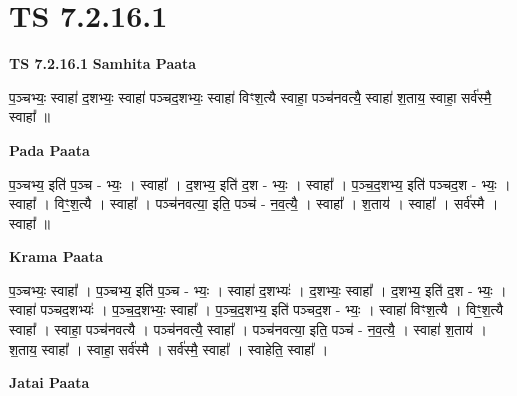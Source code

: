 \documentclass[17pt]{extarticle}
\begin{document}
\section{ TS 7.2.16.1 }

\textbf{TS 7.2.16.1 } \newline
\textbf{Samhita Paata} \newline

प॒ञ्चभ्यः॒ स्वाहा॑ द॒शभ्यः॒ स्वाहा॑ पञ्चद॒शभ्यः॒ स्वाहा॑ विꣳश॒त्यै स्वाहा॒ पञ्च॑नवत्यै॒ स्वाहा॑ श॒ताय॒ स्वाहा॒ सर्व॑स्मै॒ स्वाहा᳚ ॥ \newline

\textbf{Pada Paata} \newline

प॒ञ्चभ्य॒ इति॑ प॒ञ्च - भ्यः॒ । स्वाहा᳚ । द॒शभ्य॒ इति॑ द॒श - भ्यः॒ । स्वाहा᳚ । प॒ञ्च॒द॒शभ्य॒ इति॑ पञ्चद॒श - भ्यः॒ । स्वाहा᳚ । विꣳ॒॒श॒त्यै । स्वाहा᳚ । पञ्च॑नवत्या॒ इति॒ पञ्च॑ - न॒व॒त्यै॒ । स्वाहा᳚ । श॒ताय॑ । स्वाहा᳚ । सर्व॑स्मै । स्वाहा᳚ ॥  \newline


\textbf{Krama Paata} \newline

प॒ञ्चभ्यः॒ स्वाहा᳚ । प॒ञ्चभ्य॒ इति॑ प॒ञ्च - भ्यः॒ । स्वाहा॑ द॒शभ्यः॑ । द॒शभ्यः॒ स्वाहा᳚ । द॒शभ्य॒ इति॑ द॒श - भ्यः॒ । स्वाहा॑ पञ्चद॒शभ्यः॑ । प॒ञ्च॒द॒शभ्यः॒ स्वाहा᳚ । प॒ञ्च॒द॒शभ्य॒ इति॑ पञ्चद॒श - भ्यः॒ । स्वाहा॑ विꣳश॒त्यै । विꣳ॒॒श॒त्यै स्वाहा᳚ । स्वाहा॒ पञ्च॑नवत्यै । पञ्च॑नवत्यै॒ स्वाहा᳚ । पञ्च॑नवत्या॒ इति॒ पञ्च॑ - न॒व॒त्यै॒ । स्वाहा॑ श॒ताय॑ । श॒ताय॒ स्वाहा᳚ । स्वाहा॒ सर्व॑स्मै । सर्व॑स्मै॒ स्वाहा᳚ । स्वाहेति॒ स्वाहा᳚ । \newline

\textbf{Jatai Paata} \newline
\end{document}

